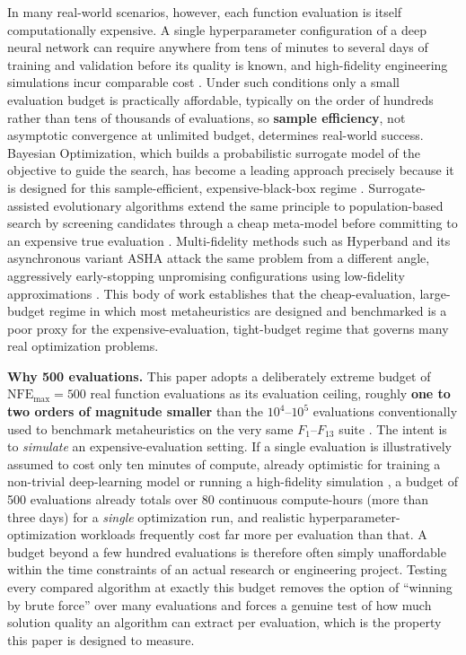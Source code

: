 \documentclass[preprint,12pt]{elsarticle}
\begin{document}
In many real-world scenarios, however, each function evaluation is itself computationally expensive. A single hyperparameter configuration of a deep neural network can require anywhere from tens of minutes to several days of training and validation before its quality is known, and high-fidelity engineering simulations incur comparable cost \cite{shahriari2016taking}. Under such conditions only a small evaluation budget is practically affordable, typically on the order of hundreds rather than tens of thousands of evaluations, so \textbf{sample efficiency}, not asymptotic convergence at unlimited budget, determines real-world success. Bayesian Optimization, which builds a probabilistic surrogate model of the objective to guide the search, has become a leading approach precisely because it is designed for this sample-efficient, expensive-black-box regime \cite{shahriari2016taking}. Surrogate-assisted evolutionary algorithms extend the same principle to population-based search by screening candidates through a cheap meta-model before committing to an expensive true evaluation \cite{jin2011surrogate,chugh2018surrogate}. Multi-fidelity methods such as Hyperband and its asynchronous variant ASHA attack the same problem from a different angle, aggressively early-stopping unpromising configurations using low-fidelity approximations \cite{li2018hyperband,li2020asha}. This body of work establishes that the cheap-evaluation, large-budget regime in which most metaheuristics are designed and benchmarked is a poor proxy for the expensive-evaluation, tight-budget regime that governs many real optimization problems.

\textbf{Why 500 evaluations.} This paper adopts a deliberately extreme budget of $\mathrm{NFE}_{\max} = 500$ real function evaluations as its evaluation ceiling, roughly \textbf{one to two orders of magnitude smaller} than the $10^4$--$10^5$ evaluations conventionally used to benchmark metaheuristics on the very same $F_1$--$F_{13}$ suite \cite{yao1999evolutionary}. The intent is to \emph{simulate} an expensive-evaluation setting. If a single evaluation is illustratively assumed to cost only ten minutes of compute, already optimistic for training a non-trivial deep-learning model or running a high-fidelity simulation \cite{shahriari2016taking,jin2011surrogate}, a budget of 500 evaluations already totals over 80 continuous compute-hours (more than three days) for a \emph{single} optimization run, and realistic hyperparameter-optimization workloads frequently cost far more per evaluation than that. A budget beyond a few hundred evaluations is therefore often simply unaffordable within the time constraints of an actual research or engineering project. Testing every compared algorithm at exactly this budget removes the option of ``winning by brute force'' over many evaluations and forces a genuine test of how much solution quality an algorithm can extract per evaluation, which is the property this paper is designed to measure.
\end{document}
